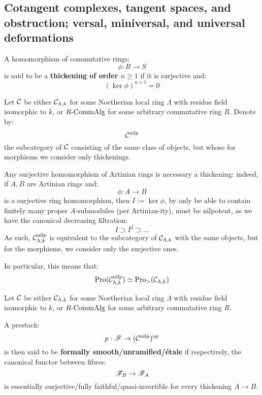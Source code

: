     \subsection{Cotangent complexes, tangent spaces, and obstruction; versal, miniversal, and universal deformations}
        \begin{definition}[Thickenings] \label{def: thickenings}
            A homomorphism of commutative rings:
                $$\phi: R \to S$$
            is said to be a \textbf{thickening of order $n \geq 1$} if it is surjective and:
                $$(\ker \phi)^{n + 1} = 0$$
        \end{definition}
        \begin{convention}
            Let $\mathcal{C}$ be either $\mathcal{C}_{\Lambda, k}$ for some Noetherian local ring $\Lambda$ with residue field isomorphic to $k$, or $R\text{-}\mathrm{Comm}\mathrm{Alg}$ for some arbitrary commutative ring $R$. Denote by:
                $$\mathcal{C}^{\mathrm{nilp}}$$
            the subcategory of $\mathcal{C}$ consisting of the same class of objects, but whose for morphisms we consider only thickenings.
        \end{convention}
        \begin{remark}
            Any surjective homomorphism of Artinian rings is necessary a thickening: indeed, if $A, B$ are Artinian rings and:
                $$\phi: A \to B$$
            is a surjective ring homomorphism, then $I := \ker \phi$, by only be able to contain finitely many proper $A$-submodules (per Artinian-ity), must be nilpotent, as we have the canonical decreasing filtration:
                $$I \supset I^2 \supset ...$$
            As such, $\mathcal{C}_{\Lambda, k}^{\mathrm{nilp}}$ is equivalent to the subcategory of $\mathcal{C}_{\Lambda, k}$ with the same objects, but for the morphisms, we consider only the surjective ones.

            In particular, this means that:
                $$\mathrm{Pro}(\mathcal{C}_{\Lambda, k}^{\mathrm{nilp}}) \simeq \mathrm{Pro}_{>}(\mathcal{C}_{\Lambda, k})$$
        \end{remark}
        \begin{definition} \label{def: formally_smooth_unramified_and_etale_prestacks}
            Let $\mathcal{C}$ be either $\mathcal{C}_{\Lambda, k}$ for some Noetherian local ring $\Lambda$ with residue field isomorphic to $k$, or $R\text{-}\mathrm{Comm}\mathrm{Alg}$ for some arbitrary commutative ring $R$.
            
            A prestack:
                $$p: \mathscr{F} \to (\mathcal{C}^{\mathrm{nilp}})^{\mathrm{op}}$$
            is then said to be \textbf{formally smooth/unramified/\'etale} if respectively, the canonical functor between fibres:
                $$\mathscr{F}_B \to \mathscr{F}_A$$
            is essentially surjective/fully faithful/quasi-invertible for every thickening $A \to B$.
        \end{definition}
